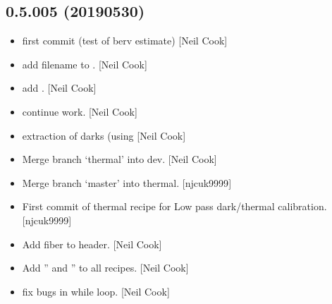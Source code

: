 \documentclass[a4paper,10pt,english]{report}
\begin{document}
\subsection{0.5.005 (2019\sphinxhyphen{}05\sphinxhyphen{}30)}
\label{\detokenize{misc/changelog:id151}}\begin{itemize}
\item {} 
 \sphinxhyphen{} first commit (test of berv estimate) {[}Neil Cook{]}

\item {} 
 \sphinxhyphen{} add filename to . {[}Neil Cook{]}

\item {} 
 \sphinxhyphen{} add . {[}Neil Cook{]}

\item {} 
 \sphinxhyphen{} continue work. {[}Neil Cook{]}

\item {} 
 \sphinxhyphen{} extraction of darks (using  {[}Neil
Cook{]}

\item {} 
Merge branch ‘thermal’ into dev. {[}Neil Cook{]}

\item {} 
Merge branch ‘master’ into thermal. {[}njcuk9999{]}

\item {} 
First commit of thermal recipe for Low pass dark/thermal calibration.
{[}njcuk9999{]}

\item {} 
Add fiber to header. {[}Neil Cook{]}

\item {} 
Add ” and ” to all recipes. {[}Neil Cook{]}

\item {} 
 \sphinxhyphen{} fix bugs in while loop. {[}Neil Cook{]}

\end{itemize}
\end{document}
